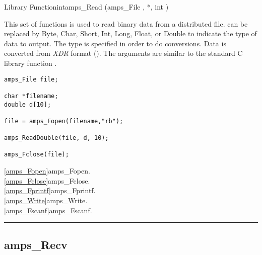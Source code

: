 \begin{deftypefn}{Library Function}{int}{amps\_Read}
(amps_File ,  *, int ) 

\DESCRIPTION

This set of functions is used to read binary data from a distributed file.
  can be replaced by Byte, Char, Short, Int, Long, Float, or Double
to indicate the type of data to output.  The type is specified in order
to do conversions.  Data is converted from {\em XDR} format (\cite{xdr.87}).
The arguments are similar to the standard C library function
.

\EXAMPLE
\begin{display}\begin{verbatim}
amps_File file;

char *filename;
double d[10];

file = amps_Fopen(filename,"rb");

amps_ReadDouble(file, d, 10);

amps_Fclose(file);
\end{verbatim}\end{display}

\SEEALSO
\vref{amps_Fopen}{amps\_Fopen}. \\
\vref{amps_Fclose}{amps\_Fclose}. \\
\vref{amps_Fprintf}{amps\_Fprintf}. \\
\vref{amps_Write}{amps\_Write}. \\
\vref{amps_Fscanf}{amps\_Fscanf}. \\

\end{deftypefn}



\noindent\rule{\textwidth}{1mm}

\subsection{amps\_Recv}
\label{amps_Recv}


